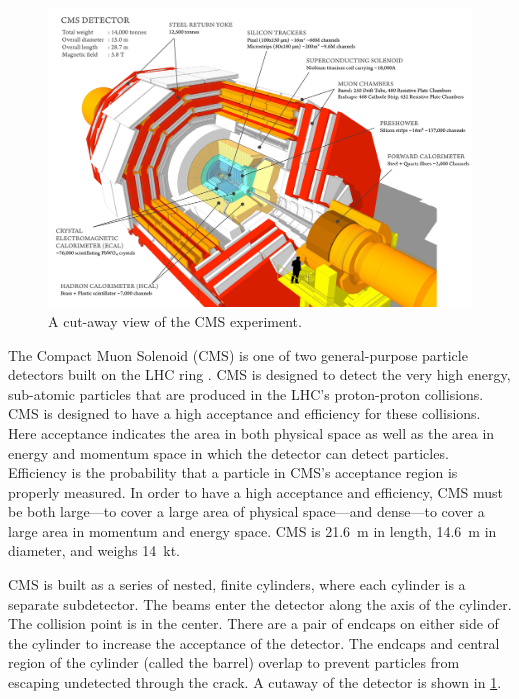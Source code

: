 \begin{figure}[!htbp]
    \centering
    \includegraphics[width=\textwidth]{figures/cms_cutaway.pdf}
    \caption{
        A cut-away view of the CMS experiment.
    }
    \label{fig:cms_cutaway}
\end{figure}

The Compact Muon Solenoid (CMS) is one of two general-purpose particle
detectors built on the LHC ring \cite{cms_tdr_1,cms_tdr_2}. CMS is designed to
detect the very high energy, sub-atomic particles that are produced in the
LHC's proton-proton collisions. CMS is designed to have a high acceptance and
efficiency for these collisions. Here acceptance indicates the area in both
physical space as well as the area in energy and momentum space in which the
detector can detect particles. Efficiency is the probability that a particle in
CMS's acceptance region is properly measured. In order to have a high
acceptance and efficiency, CMS must be both large---to cover a large area of
physical space---and dense---to cover a large area in momentum and energy
space. CMS is \SI{21.6}{\meter} in length, \SI{14.6}{\meter} in diameter, and
weighs \SI{14}{\kilo\tonne}.

CMS is built as a series of nested, finite cylinders, where each cylinder is a
separate subdetector. The beams enter the detector along the axis of the
cylinder. The collision point is in the center. There are a pair of endcaps on
either side of the cylinder to increase the acceptance of the detector. The
endcaps and central region of the cylinder (called the barrel) overlap to
prevent particles from escaping undetected through the crack. A cutaway of the
detector is shown in \cref{fig:cms_cutaway}.


